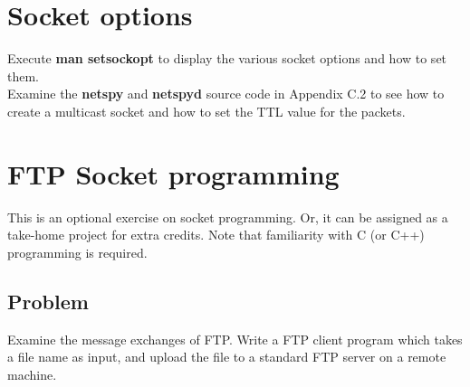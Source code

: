 \documentclass{../UTNetLab}
\begin{document}
\section{Socket options}
    Execute \textbf{man setsockopt} to display the various socket options and how to set them.\\
    Examine the \textbf{netspy} and \textbf{netspyd} source code in Appendix C.2 to see how to create a multicast socket and how to set the TTL value for the packets.


\section{FTP Socket programming}
    This is an optional exercise on socket programming. Or, it can be assigned as a take-home project for extra credits. Note that familiarity with C (or C++) programming is required.

    \subsection*{Problem}
    Examine the message exchanges of FTP. Write a FTP client program which takes a file name as input, and upload the file to a standard FTP server on a remote machine.
\end{document}
